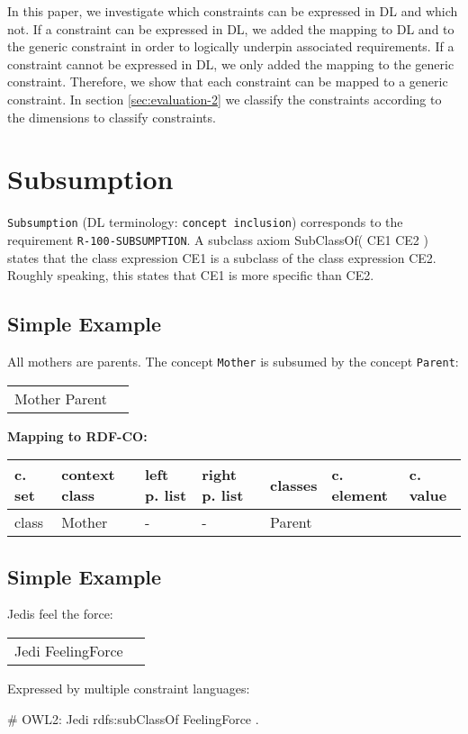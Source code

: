 \documentclass{llncs}
\newcommand{\ms}[1]{\texttt{#1}}
\newenvironment{gcotable}{
  \scriptsize
  \sffamily
  \vspace{0cm}
	\begin{center}
	\textbf{\vspace{0.4cm}Mapping to RDF-CO:} \\
  \begin{tabular}{l|l|l|l|l|l|l}
	\hline
  \textbf{c. set} & \textbf{context class} & \textbf{left p. list} & \textbf{right p. list} & \textbf{classes} & \textbf{c. element} & \textbf{c. value} \\
  \hline

}{
  \hline
  \end{tabular}
	\end{center}
}
\newenvironment{DL}{
\vspace{0cm}
	\begin{center}
  \begin{tabular}{r l}

}{
  \end{tabular}
	\end{center}
}
\begin{document}
In this paper, we investigate which constraints can be expressed in DL and which not.
If a constraint can be expressed in DL, we added the mapping to DL and to the generic constraint in order to logically underpin associated requirements.
If a constraint cannot be expressed in DL, we only added the mapping to the generic constraint.
Therefore, we show that each constraint can be mapped to a generic constraint.
In section \ref{sec:evaluation-2} we classify the constraints according to the dimensions to classify constraints.

\section{Subsumption}

\ms{Subsumption} (DL terminology: \ms{concept inclusion}) corresponds to the requirement \ms{R-100-SUBSUMPTION}.
A subclass axiom SubClassOf( CE1 CE2 ) states that the class expression CE1 is a subclass of the class expression CE2. 
Roughly speaking, this states that CE1 is more specific than CE2.

\subsection{Simple Example}

All mothers are parents.
The concept \ms{Mother} is subsumed by the concept \ms{Parent}:

\begin{DL}
Mother  Parent \\
\end{DL}

\begin{gcotable}
class & Mother & - & - & Parent &  \\
\end{gcotable}

\subsection{Simple Example}

Jedis feel the force:

\begin{DL}
Jedi  FeelingForce
\end{DL}

Expressed by multiple constraint languages:

\begin{ex}
# OWL2:
Jedi rdfs:subClassOf FeelingForce .
\end{ex}
\end{document}
